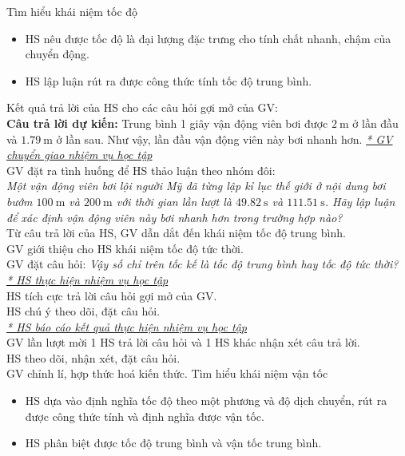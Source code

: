 \hoatdong
{
	Tìm hiểu khái niệm tốc độ
}
{\begin{itemize}
		\item HS nêu được tốc độ là đại lượng đặc trưng cho tính chất nhanh, chậm của chuyển động.
		\item HS lập luận rút ra được công thức tính tốc độ trung bình.
	\end{itemize}
	
}
{
	Kết quả trả lời của HS cho các câu hỏi gợi mở của GV:\\
	\textbf{Câu trả lời dự kiến:} Trung bình 1 giây vận động viên bơi được $\SI{2}{\meter}$ ở lần đầu và $\SI{1.79}{\meter}$ ở lần sau. Như vậy, lần đầu vận động viên này bơi nhanh hơn.
}
{\textit{\underline{* GV chuyển giao nhiệm vụ học tập}}\\
GV đặt ra tình huống để HS thảo luận theo nhóm đôi:\\
\textit{Một vận động viên bơi lội người Mỹ đã từng lập kỉ lục thế giới ở nội dung bơi bướm $\SI{100}{\meter}$ và $\SI{200}{\meter}$ với thời gian lần lượt là $\SI{49.82}{\second}$ và $\SI{111.51}{\second}$. Hãy lập luận để xác định vận động viên này bơi nhanh hơn trong trường hợp nào?}\\
Từ câu trả lời của HS, GV dẫn dắt đến khái niệm tốc độ trung bình.\\
GV giới thiệu cho HS khái niệm tốc độ tức thời.\\
GV đặt câu hỏi: \textit{Vậy số chỉ trên tốc kế là tốc độ trung bình hay tốc độ tức thời?}\\
\textit{\underline{* HS thực hiện nhiệm vụ học tập}}\\
HS tích cực trả lời câu hỏi gợi mở của GV.\\
HS chú ý theo dõi, đặt câu hỏi.\\
\textit{\underline{* HS báo cáo kết quả thực hiện nhiệm vụ học tập}}\\
GV lần lượt mời 1 HS trả lời câu hỏi và 1 HS khác nhận xét câu trả lời.\\
HS theo dõi, nhận xét, đặt câu hỏi.\\
GV chỉnh lí, hợp thức hoá kiến thức.
}
\hoatdong
{
	Tìm hiểu khái niệm vận tốc
}
{\begin{itemize}
		\item HS dựa vào định nghĩa tốc độ theo một phương và độ dịch chuyển, rút ra được công thức tính và định nghĩa được vận tốc.
		\item HS phân biệt được tốc độ trung bình và vận tốc trung bình.
	\end{itemize}

}
